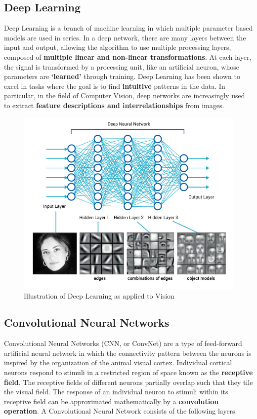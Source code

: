 \documentclass{article}
\begin{document}
			\subsection{Deep Learning}
				Deep Learning is a branch of machine learning in which multiple parameter based models are used in series. In a deep network, there are many layers between the input and output, allowing the algorithm to use multiple processing layers, composed of \textbf{multiple linear and non-linear transformations}. At each layer, the signal is transformed by a processing unit, like an artificial neuron, whose parameters are \textbf{`learned'} through training. Deep Learning has been shown to excel in tasks where the goal is to find \textbf{intuitive} patterns in the data. In particular, in the field of Computer Vision, deep networks are increasingly used to extract \textbf{feature descriptions and interrelationships} from images.
				\begin{figure}[ht!]
					\includegraphics[width=14cm]{blog_deeplearning3.jpg}
					\caption{Illustration of Deep Learning as applied to Vision\label{fig2}}
				\end{figure}	

			\subsection{Convolutional Neural Networks}
			Convolutional Neural Networks (CNN, or ConvNet) are a type of feed-forward artificial neural network in which the connectivity pattern between the neurons is inspired by the organization of the animal visual cortex. Individual cortical neurons respond to stimuli in a restricted region of space known as the \textbf{receptive field}. The receptive fields of different neurons partially overlap such that they tile the visual field. The response of an individual neuron to stimuli within its receptive field can be approximated mathematically by a \textbf{convolution operation}. A Convolutional Neural Network consists of the following layers.
								
\end{document}
